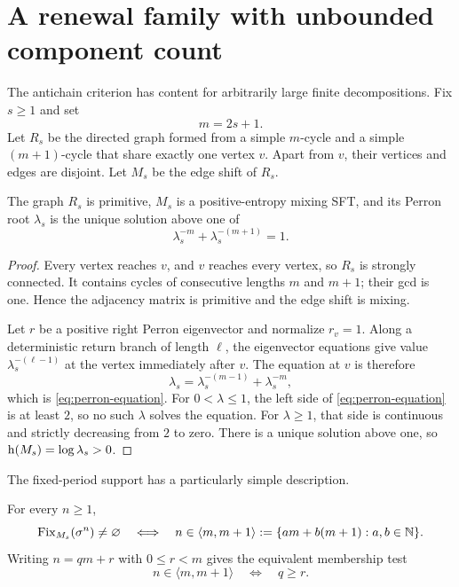 \section{A renewal family with unbounded component count}
\label{sec:renewal}

The antichain criterion has content for arbitrarily large finite
decompositions.  Fix $s\geq1$ and set
\begin{equation}
  m=2s+1.
  \label{eq:m-def}
\end{equation}
Let $R_s$ be the directed graph formed from a simple $m$-cycle and a simple
$(m+1)$-cycle that share exactly one vertex $v$.  Apart from $v$, their
vertices and edges are disjoint.  Let $M_s$ be the edge shift of $R_s$.

\begin{proposition}
\label{prop:perron}
The graph $R_s$ is primitive, $M_s$ is a positive-entropy mixing SFT, and its
Perron root $\lambda_s$ is the unique solution above one of
\begin{equation}
  \lambda_s^{-m}+\lambda_s^{-(m+1)}=1.
  \label{eq:perron-equation}
\end{equation}
\end{proposition}

\begin{proof}
Every vertex reaches $v$, and $v$ reaches every vertex, so $R_s$ is strongly
connected.  It contains cycles of consecutive lengths $m$ and $m+1$; their
gcd is one.  Hence the adjacency matrix is primitive and the edge shift is
mixing.

Let $r$ be a positive right Perron eigenvector and normalize $r_v=1$.  Along
a deterministic return branch of length $\ell$, the eigenvector equations
give value $\lambda_s^{-(\ell-1)}$ at the vertex immediately after $v$.  The
equation at $v$ is therefore
\[
 \lambda_s
 =\lambda_s^{-(m-1)}+\lambda_s^{-m},
\]
which is \eqref{eq:perron-equation}.  For $0<\lambda\leq1$, the left side of
\eqref{eq:perron-equation} is at least $2$, so no such $\lambda$ solves the
equation.  For $\lambda\geq1$, that side is continuous and strictly decreasing
from $2$ to zero.  There is a unique solution above one, so
$\operatorname{h}(M_s)=\log\lambda_s>0$.
\end{proof}

The fixed-period support has a particularly simple description.

\begin{proposition}
\label{prop:renewal-support}
For every $n\geq1$,
\begin{equation}
 \operatorname{Fix}_{M_s}(\sigma^n)\ne\varnothing
 \quad\Longleftrightarrow\quad
 n\in\langle m,m+1\rangle
 :=\{am+b(m+1):a,b\in\mathbb{N}\}.
 \label{eq:renewal-support}
\end{equation}
Writing $n=qm+r$ with $0\leq r<m$ gives the equivalent membership test
\begin{equation}
  n\in\langle m,m+1\rangle
  \quad\Longleftrightarrow\quad q\geq r.
  \label{eq:qr-membership}
\end{equation}
\end{proposition}

